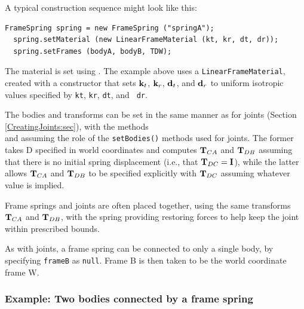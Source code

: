 A typical construction sequence might look like this:
%
\begin{lstlisting}[]
  FrameSpring spring = new FrameSpring ("springA");
  spring.setMaterial (new LinearFrameMaterial (kt, kr, dt, dr));
  spring.setFrames (bodyA, bodyB, TDW);
\end{lstlisting}
%
The material is set using
.
The example above uses a {\tt LinearFrameMaterial}, created with a
constructor that sets ${\bf k}_t$, ${\bf k}_r$, ${\bf d}_t$, and ${\bf d}_r$ to uniform
isotropic values specified by {\tt kt}, {\tt kr}, {\tt dt}, and {\tt
dr}. 

The bodies and transforms can be set in the same manner as for joints
(Section \ref{CreatingJoints:sec}), with the
methods\\ 
and
assuming the role of the {\tt setBodies()} methods used for joints.
The former takes D specified in world coordinates and computes
${\bf T}_{CA}$ and ${\bf T}_{DB}$ assuming that there is no initial spring
displacement (i.e., that ${\bf T}_{DC} = {\bf I}$), while the latter allows
${\bf T}_{CA}$ and ${\bf T}_{DB}$ to be specified explicitly with ${\bf T}_{DC}$
assuming whatever value is implied.

Frame springs and joints are often placed together, using the same
transforms ${\bf T}_{CA}$ and ${\bf T}_{DB}$, with the spring providing
restoring forces to help keep the joint within prescribed bounds.

As with joints, a frame spring can be connected to only a single body,
by specifying {\tt frameB} as {\tt null}. Frame B is then taken to be
the world coordinate frame W.

\subsubsection{Example: Two bodies connected by a frame spring}

